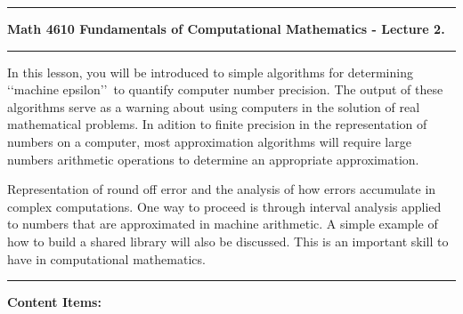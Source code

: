 \documentclass[10pt,fleqn]{article}
\begin{document}
\vskip0.1in\hrule\vskip0.1in
\noindent
{\bf Math 4610 Fundamentals of Computational Mathematics  - Lecture 2.} 
\vskip0.1in\hrule\vskip0.1in
\noindent
In this lesson, you will be introduced to simple algorithms for determining
\lq\lq machine epsilon\rq\rq\ to quantify computer number precision. The output
of these algorithms serve as a warning about using computers in the solution of
real mathematical problems. In adition to finite precision in the representation
of numbers on a computer, most approximation algorithms will require large
numbers arithmetic operations to determine an appropriate approximation.

Representation of round off error and the analysis of how errors accumulate in
complex computations. One way to proceed is through interval analysis applied to
numbers that are approximated in machine arithmetic. A simple 
example of how to build a shared library will also be discussed. This is an
important skill to have in computational mathematics.
\vskip0.1in\hrule\vskip0.1in
\noindent
{\bf Content Items:}
\end{document}

